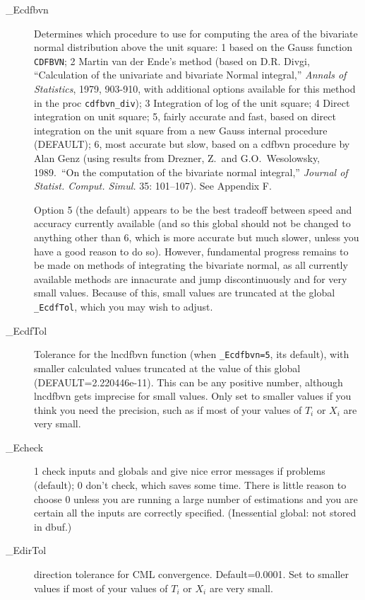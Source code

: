 \documentclass[11pt,titlepage]{article}
\begin{document}
\begin{description}
\item[\_Ecdfbvn] Determines which procedure to use for computing the
  area of the bivariate normal distribution above the unit square: 1
  based on the Gauss function \texttt{CDFBVN}; 2 Martin van der Ende's
  method (based on D.R. Divgi, ``Calculation of the univariate and
  bivariate Normal integral,'' \emph{Annals of Statistics}, 1979,
  903-910, with additional options available for this method in the
  proc \texttt{cdfbvn\_div}); 3 Integration of log of the unit square;
  4 Direct integration on unit square; 5, fairly accurate and fast,
  based on direct integration on the unit square from a new Gauss
  internal procedure (DEFAULT); 6, most accurate but slow, based on a
  cdfbvn procedure by Alan Genz (using results from Drezner, Z.\ and
  G.O.\ Wesolowsky, 1989.\ ``On the computation of the bivariate
  normal integral,'' \emph{Journal of Statist. Comput. Simul.} 35:
  101--107).  See Appendix F.

  Option 5 (the default) appears to be the best tradeoff between speed
  and accuracy currently available (and so this global should not be
  changed to anything other than 6, which is more accurate but much
  slower, unless you have a good reason to do so).  However,
  fundamental progress remains to be made on methods of integrating
  the bivariate normal, as all currently available methods are
  innacurate and jump discontinuously and for very small values.
  Because of this, small values are truncated at the global
  \texttt{\_EcdfTol}, which you may wish to adjust.

\item[\_EcdfTol] Tolerance for the lncdfbvn function (when
  \texttt{\_Ecdfbvn=5}, its default), with smaller calculated values
  truncated at the value of this global (DEFAULT=2.220446e-11).  This
  can be any positive number, although lncdfbvn gets imprecise for
  small values.  Only set to smaller values if you think you need the
  precision, such as if most of your values of $T_i$ or $X_i$ are very
  small.

\item[\_Echeck] 1 check inputs and globals and give nice error
  messages if problems (default); 0 don't check, which saves some
  time.  There is little reason to choose 0 unless you are running a
  large number of estimations and you are certain all the inputs are
  correctly specified.  (Inessential global: not stored in dbuf.)

\item[\_EdirTol] direction tolerance for CML convergence.
  Default=0.0001.  Set to smaller values if most of your values of
  $T_i$ or $X_i$ are very small.


\end{description}
\end{document}
